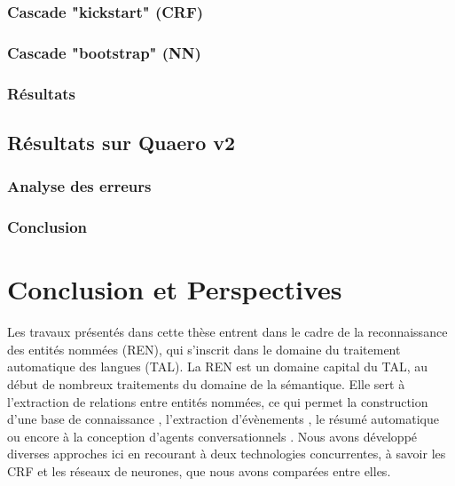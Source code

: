 \documentclass[12pt,a4paper,times,twoside,openright]{report}
\begin{document}
        \subsection{Cascade "kickstart" (CRF)}
        \label{subsec:kickstart-parsing}
        
    
        \subsection{Cascade "bootstrap" (NN)}
        \label{subsec:bootstrap-parsing}
        
    
        \subsection{Résultats}
        \label{subsec:cascades-results}
        
    
    \section{Résultats sur Quaero v2}
    \label{sec:quaero-v2-results}
    
    
        \subsection{Analyse des erreurs}
        \label{subsec:cascades-error-analysis}
        
        
    \subsection{Conclusion}
    \label{sec:cascade-conclusion}
    



\chapter{Conclusion et Perspectives}
\label{chap:conclusion-and-perspectives}

Les travaux présentés dans cette thèse entrent dans le cadre de la reconnaissance des entités nommées (REN), qui s'inscrit dans le domaine du traitement automatique des langues (TAL). La REN est un domaine capital du TAL, au début de nombreux traitements du domaine de la sémantique. Elle sert à l'extraction de relations entre entités nommées, ce qui permet la construction d'une base de connaissance \citep{surdeanu2014overview,rahman2017tac}, l'extraction d'évènements \citep{kumaran2004text}, le résumé automatique \citep{nobata2002summarization,spitz2016terms} ou encore à la conception d'agents conversationnels \citep{cahn2017chatbot}. Nous avons développé diverses approches ici en recourant à deux technologies concurrentes, à savoir les CRF et les réseaux de neurones, que nous avons comparées entre elles.
\end{document}
